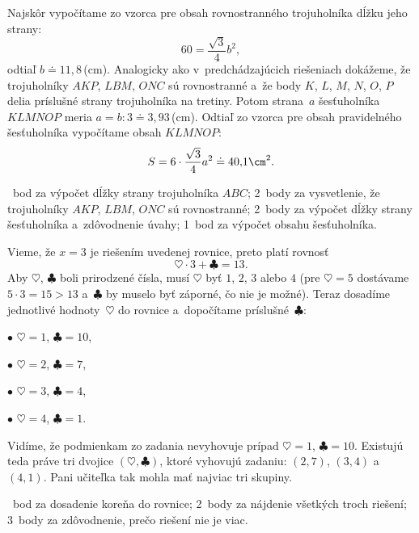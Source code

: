 {Najskôr vypočítame zo vzorca pre obsah rovnostranného trojuholníka dĺžku jeho
strany:
$$
60=\frac{\sqrt 3}4b^2,
$$
odtiaľ $b\doteq11{,}8$\,(cm).
Analogicky ako v~predchádzajúcich riešeniach dokážeme, že trojuholníky $AKP$,
$LBM$, $ONC$ sú rovnostranné a~že body $K$, $L$, $M$, $N$, $O$, $P$ delia
príslušné strany trojuholníka na tretiny. Potom strana~$a$ šesťuholníka
$KLMNOP$ meria $a=b:3 \doteq3{,}93$\,(cm).
Odtiaľ zo vzorca pre obsah pravidelného šesťuholníka vypočítame obsah
$KLMNOP$:
$$
S=6\cdot\frac{\sqrt3}4a^2\doteq 40{,}1\cm^2.
$$

~bod za výpočet dĺžky strany trojuholníka $ABC$;
2~body za vysvetlenie, že trojuholníky $AKP$, $LBM$, $ONC$ sú rovnostranné;
2~body za výpočet dĺžky strany šesťuholníka a~zdôvodnenie úvahy;
1~bod za výpočet obsahu šesťuholníka.
\endhodnotenie
}

{%
Vieme, že $x=3$ je riešením uvedenej rovnice, preto platí rovnosť
$$
 \heartsuit\cdot 3+\clubsuit =13.
$$
Aby $\heartsuit$, $\clubsuit$ boli prirodzené čísla, musí $\heartsuit$ byť $1$, $2$, $3$ alebo $4$
(pre $\heartsuit=5$ dostávame $5\cdot 3 = 15 > 13$ a~$\clubsuit$ by muselo byť záporné, čo
nie je možné).
Teraz dosadíme jednotlivé hodnoty~$\heartsuit$ do rovnice a~dopočítame príslušné~$\clubsuit$:
  \item{$\bullet$} $\heartsuit=1$, $\clubsuit=10$,
  \item{$\bullet$} $\heartsuit=2$, $\clubsuit=7$,
  \item{$\bullet$} $\heartsuit=3$, $\clubsuit=4$,
  \item{$\bullet$} $\heartsuit=4$, $\clubsuit=1$.

Vidíme, že podmienkam zo zadania nevyhovuje prípad $\heartsuit=1$, $\clubsuit=10$.
Existujú teda práve tri dvojice $(\heartsuit,\clubsuit)$, ktoré vyhovujú zadaniu: $(2,7)$, $(3,4)$ a~$(4,1)$.
Pani učiteľka tak mohla mať najviac tri skupiny.

~bod za dosadenie koreňa do rovnice;
2~body za nájdenie všetkých troch riešení;
3~body za zdôvodnenie, prečo riešení nie je viac.
\endhodnotenie
}

